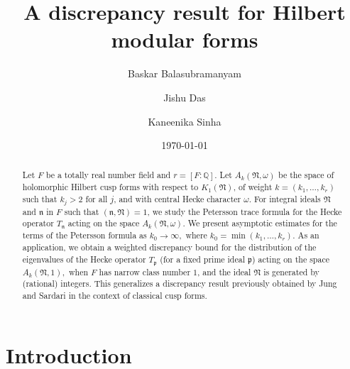 \documentclass[reqno]{amsart}
\theoremstyle{plain}
\theoremstyle{definition}
\theoremstyle{remark}
\begin{document}
 
\title{A discrepancy result for Hilbert modular forms}

\author[Baskar Balasubramanyam]{Baskar Balasubramanyam}
\date{\today}
\address{Baskar Balasubramanyam, IISER Pune, Dr Homi Bhabha Road, Pashan, Pune - 411008, Maharashtra, India}
\author[Jishu Das]{Jishu Das}
 \address{Department of Applied Sciences and Humanities, Mathematics Section, 
 COEP Technological University, Wellesley Road, Shivajinagar, Pune, Maharashtra 411005, India.}
\author[Kaneenika Sinha]{Kaneenika Sinha}
\address{Kaneenika Sinha, IISER Pune, Dr Homi Bhabha Road, Pashan, Pune - 411008, Maharashtra, India}

\begin{abstract}
Let $F $ be a totally real number field and $r=[F :\mathbb{Q}].$ Let $A_k(\mathfrak{N},\omega) $ be the space of holomorphic Hilbert cusp forms with respect to  $K_1(\mathfrak{N})$, of weight $k=(k_1,\dots,k_r)$ such that $k_j>2$ for all $j$, and with central Hecke character $\omega$. For integral ideals $\mathfrak{N}$ and $\mathfrak{n}$ in $F$ such that $( \mathfrak{n}, \mathfrak{N}) = 1$, we study the Petersson trace formula  for the Hecke operator $T_{\mathfrak{n}}$ acting on the space $A_k(\mathfrak{N},\omega)$.  We present asymptotic estimates for the terms of the Petersson formula  as $k_0\rightarrow\infty,$  where $k_0=\min(k_1,\dots,k_r)$. As an application, we obtain a weighted discrepancy bound for the distribution of the eigenvalues of the Hecke operator $T_{\mathfrak{p}}$ (for a fixed prime ideal $\mathfrak{p}$) acting on the space $A_k(\mathfrak{N},1),$ when $F$ has narrow class number $1$,  and the ideal $\mathfrak{N}$ is generated by (rational) integers.  This generalizes a discrepancy result previously obtained by Jung and Sardari \cite{JS} in the context of classical cusp forms.
\end{abstract}

\maketitle

\section{Introduction}
\end{document}
